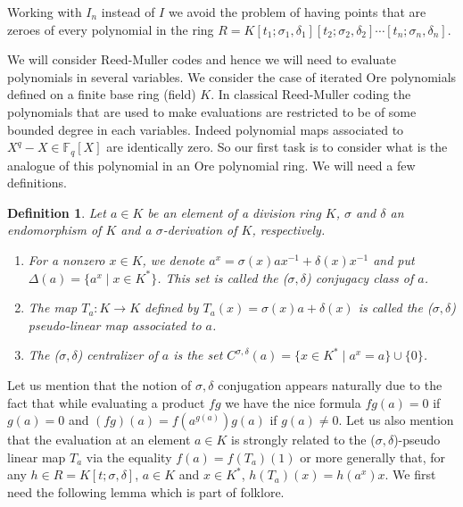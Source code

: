 \documentclass{amsproc}
\newcommand{\ff}{\mathbb{F}}
\newcommand{\de}{\delta}
\newcommand{\si}{\sigma}
\newtheorem{definition}[theorem]{Definition}
\numberwithin{equation}{section}
\newcommand{\mulo}{K[t_1;\si_1,\de_1][t_2;\si_2,\de_2]\cdots[t_n;\si_n,\de_n]}
\begin{document}
Working with $I_n$ instead of $I$ we avoid the problem of having points that are zeroes of every polynomial in the ring $R=\mulo$.   

We will consider Reed-Muller codes and hence we will need to evaluate polynomials in several variables.  We consider the case of iterated Ore polynomials defined on a finite base ring (field) $K$.  In classical Reed-Muller coding the polynomials that are used to make evaluations are restricted to be of some bounded degree in each variables.   Indeed polynomial maps associated to $X^q-X\in \ff_q[X]$ are identically zero.  So our first task is to consider what is the analogue of this polynomial in an Ore polynomial ring.   We will need a few definitions.

\begin{definition}
	Let $a\in K$ be an element of a division ring $K$, $\si$ and $\de$ an endomorphism of $K$ and a 
	$\si$-derivation of $K$, respectively.
	\begin{enumerate}
		\item For a nonzero $x\in K$, we denote  $a^x=\si(x)ax^{-1} + \de(x)x^{-1}$ and put $\Delta(a)=\{a^x \mid x\in K^*\}$.  This set is called the ($\sigma,\delta$) conjugacy class of $a$.
		\item The map $T_a:K \longrightarrow K$ defined by  $T_a(x)=\si(x)a +\de(x)$ is called the ($\si,\de$) pseudo-linear map associated to $a$.
		\item The ($\si,\de$) centralizer of $a$ is the set $C^{\si,\de}(a)=\{x\in K^* \mid a^x=a\}\cup \{0\}$.
	\end{enumerate} 
\end{definition} 
Let us mention that the notion of $\si,\de$ conjugation appears naturally due to the fact that while evaluating a product $fg$ we have the nice formula $fg(a)=0$ if $g(a)=0$ and $(fg)(a)=f(a^{g(a)})g(a)$ if $g(a)\ne 0$.  Let us also mention that the evaluation at an element $a\in K$ is strongly related to the ($\si,\de$)-pseudo linear map $T_a$ via the equality $f(a)=f(T_a)(1)$ or more generally that, for any $h\in R=K[t;\si,\de]$, $a\in K$ and $x\in K^*$,  $h(T_a)(x)=h(a^x)x$. 
We first need the following lemma which is part of folklore. 
\end{document}
